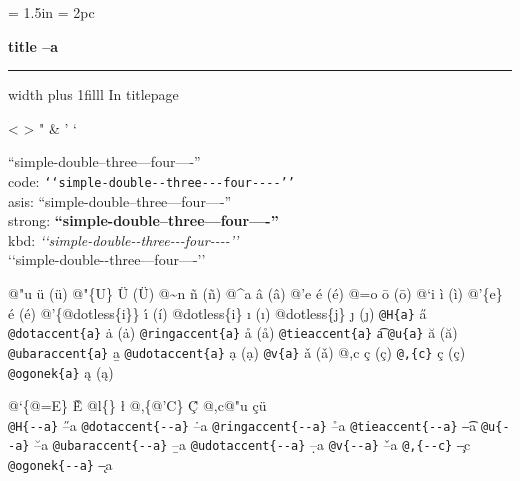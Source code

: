 \documentclass{book}
\newcommand\Texinfocommandstyletextkbd[1]{{\ttfamily\textsl{#1}}}%
\renewcommand{\_}{\Texinfounderscore\discretionary{}{}{}}
\begin{document}
\frontmatter
\begin{titlepage}
\begingroup
\newskip\titlepagetopglue \titlepagetopglue = 1.5in
\newskip\titlepagebottomglue \titlepagebottomglue = 2pc
\setlength{\parindent}{0pt}
    \vglue\titlepagetopglue
{\raggedright {\huge \bfseries title --a}}
\vskip 4pt \hrule height 4pt width \hsize \vskip 4pt
\vskip 0pt plus 1filll
%
%
In titlepage

<
>
"
\&
'
`

``simple-double--three---four----''\leavevmode{}\\
code: \texttt{{`}{`}simple-double{-}{-}three{-}{-}{-}four{-}{-}{-}-{'}{'}} \leavevmode{}\\
asis: ``simple-double--three---four----'' \leavevmode{}\\
strong: \textbf{``simple-double--three---four----''} \leavevmode{}\\
kbd: \Texinfocommandstyletextkbd{{`}{`}simple-double{-}{-}three{-}{-}{-}four{-}{-}{-}-{'}{'}} \leavevmode{}\\

`\hbox{}`simple-double-\hbox{}-three---four----'\hbox{}'\leavevmode{}\\

%
%
%
%

@"u \"{u} (ü)
@"\{U\} \"{U} (Ü) 
@\~{}n \~{n} (ñ)
@\^{}a \^{a} (â)
@'e \'{e} (é)
@=o \={o} (ō)
@`i \`{i} (ì)
@'\{e\} \'{e} (é)
@'\{@dotless\{i\}\} \'{\i{}} (í)
@dotless\{i\} \i{} (ı)
@dotless\{j\} \j{} (ȷ)
\texttt{@H\{a\}} \H{a}
\texttt{@dotaccent\{a\}} \.{a} (ȧ)
\texttt{@ringaccent\{a\}} \r{a} (å)
\texttt{@tieaccent\{a\}} \t{a}
\texttt{@u\{a\}} \u{a} (ă)
\texttt{@ubaraccent\{a\}} \b{a}
\texttt{@udotaccent\{a\}} \d{a} (ạ)
\texttt{@v\{a\}} \v{a} (ǎ)
@,c \c{c} (ç)
\texttt{@,\{c\}} \c{c} (ç)
\texttt{@ogonek\{a\}} \k{a} (ą)

@`\{@=E\} \`{\={E}}
@l\{\} \l{}
@,\{@'C\} \c{\'{C}}
@,c@"u \c{c}\"{u} \leavevmode{}\\

\texttt{@H\{{-}{-}a\}} \H{--a}
\texttt{@dotaccent\{{-}{-}a\}} \.{--a}
\texttt{@ringaccent\{{-}{-}a\}} \r{--a}
\texttt{@tieaccent\{{-}{-}a\}} \t{--a}
\texttt{@u\{{-}{-}a\}} \u{--a}
\texttt{@ubaraccent\{{-}{-}a\}} \b{--a}
\texttt{@udotaccent\{{-}{-}a\}} \d{--a}
\texttt{@v\{{-}{-}a\}} \v{--a}
\texttt{@,\{{-}{-}c\}} \c{--c}
\texttt{@ogonek\{{-}{-}a\}} \k{--a}


\end{titlepage}
\end{document}
